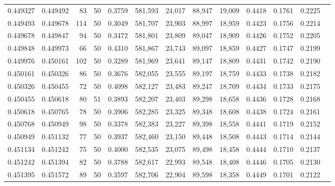 \begin{tabular}{rrrrrrrrrrrrr}
0.449327 & 0.449492 &    83 &  50 &                                     0.3759 & 581,593 &  24,017 &  88,947 &  19,009 & 0.4418 & 0.1761 & 0.2225 \\
0.449493 & 0.449678 &   114 &  50 &                                     0.3049 & 581,707 &  23,903 &  88,997 &  18,959 & 0.4423 & 0.1756 & 0.2214 \\
0.449678 & 0.449847 &    94 &  50 &                                     0.3472 & 581,801 &  23,809 &  89,047 &  18,909 & 0.4426 & 0.1752 & 0.2205 \\
0.449848 & 0.449973 &    66 &  50 &                                     0.4310 & 581,867 &  23,743 &  89,097 &  18,859 & 0.4427 & 0.1747 & 0.2199 \\
0.449976 & 0.450161 &   102 &  50 &                                     0.3289 & 581,969 &  23,641 &  89,147 &  18,809 & 0.4431 & 0.1742 & 0.2190 \\
0.450161 & 0.450326 &    86 &  50 &                                     0.3676 & 582,055 &  23,555 &  89,197 &  18,759 & 0.4433 & 0.1738 & 0.2182 \\
0.450326 & 0.450455 &    72 &  50 &                                     0.4098 & 582,127 &  23,483 &  89,247 &  18,709 & 0.4434 & 0.1733 & 0.2175 \\
0.450455 & 0.450618 &    80 &  51 &                                     0.3893 & 582,207 &  23,403 &  89,298 &  18,658 & 0.4436 & 0.1728 & 0.2168 \\
0.450618 & 0.450765 &    78 &  50 &                                     0.3906 & 582,285 &  23,325 &  89,348 &  18,608 & 0.4438 & 0.1724 & 0.2161 \\
0.450768 & 0.450949 &    98 &  50 &                                     0.3378 & 582,383 &  23,227 &  89,398 &  18,558 & 0.4441 & 0.1719 & 0.2152 \\
0.450949 & 0.451132 &    77 &  50 &                                     0.3937 & 582,460 &  23,150 &  89,448 &  18,508 & 0.4443 & 0.1714 & 0.2144 \\
0.451134 & 0.451242 &    75 &  50 &                                     0.4000 & 582,535 &  23,075 &  89,498 &  18,458 & 0.4444 & 0.1710 & 0.2137 \\
0.451242 & 0.451394 &    82 &  50 &                                     0.3788 & 582,617 &  22,993 &  89,548 &  18,408 & 0.4446 & 0.1705 & 0.2130 \\
0.451395 & 0.451572 &    89 &  50 &                                     0.3597 & 582,706 &  22,904 &  89,598 &  18,358 & 0.4449 & 0.1701 & 0.2122 \\

\end{tabular}
